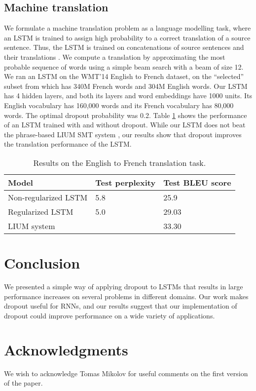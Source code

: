 \documentclass{article}
\begin{document}
\subsection{Machine translation}
\label{sec:trans}

We formulate a machine translation problem as a language modelling task, where
an LSTM is trained to assign high probability to a correct
translation of a source sentence.  Thus, the LSTM is trained on
concatenations of source sentences and their translations 
\cite{cho2014learning}. We compute a translation by 
approximating the most probable sequence of words
using a simple beam search with a beam of size 12.  We ran an
LSTM on the WMT'14 English to French dataset, on the
``selected'' subset from \citet{wmt_joint} which has 340M French words
and 304M English words.  Our LSTM has 4 hidden layers, and both its
layers and word embeddings have 1000 units.  Its 
English vocabulary has 160,000 words and its French vocabulary has
80,000 words.  The optimal dropout probability was 0.2.
Table \ref{tab:mt} shows the performance of an LSTM trained with and without dropout.
While our LSTM does not beat the phrase-based LIUM SMT system
\cite{lium}, our results show that dropout improves the
translation performance of the LSTM.

\begin{table}[t]
  \small
  \centering
  \renewcommand{\arraystretch}{1.15}
  \begin{tabular}{lll}
    \hline
     Model & Test perplexity & Test BLEU score \\
    \hline
    Non-regularized LSTM & 5.8 & 25.9 \\
    Regularized LSTM & 5.0 &  29.03 \\
    \hline
    LIUM system  &  &  33.30 \\
    \hline
  \end{tabular}
  \caption{Results on the English to French translation task. }
  \label{tab:mt}
\end{table}



\section{Conclusion}

We presented a simple way of applying dropout to LSTMs that results in
large performance increases on several problems in different domains.
Our work makes dropout useful for RNNs, and our results suggest that
our implementation of dropout could improve performance on a wide
variety of applications.

\section{Acknowledgments}

We wish to acknowledge Tomas Mikolov for useful comments on the first version of the paper.   

\small


\end{document}
